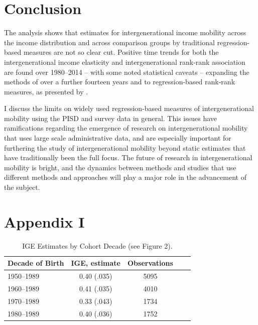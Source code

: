 \documentclass[notitlepage,12pt]{article}
\begin{document}
\section{Conclusion}
The analysis shows that estimates for intergenerational income mobility across the income distribution and across comparison groups by traditional regression-based measures are not so clear cut.  Positive time trends for both the intergenerational income elasticity and intergenerational rank-rank association are found over 1980--2014 -- with some noted statistical caveats -- expanding the methods of \cite{lee2009trends} over a further fourteen years and to regression-based rank-rank measures, as presented by \cite{chetty2014united}.

I discuss the limits on widely used regression-based measures of intergenerational mobility using the PISD and survey data in general.  This issues have ramifications regarding the emergence of research on intergenerational mobility that uses large scale administrative data, and are especially important for furthering the study of intergenerational mobility beyond static estimates that have traditionally been the full focus.  The future of research in intergenerational mobility is bright, and the dynamics between methods and studies that use different methods and approaches will play a major role in the advancement of the subject.  




\section{Appendix I}

\begin{table}[H]
\centering
\caption{IGE Estimates by Cohort Decade (see Figure 2).}
\begin{tabular}{l|cccc}
\midrule
Decade of Birth & IGE, estimate &   Observations & \\
\midrule
1950--1989            & 0.40      (.035) & 5095  \\
1960--1989            & 0.41      (.035) & 4010 \\
1970--1989            & 0.33      (.043) & 1734 \\
1980--1989            & 0.40      (.036) & 1752 \\
\midrule \bottomrule
\end{tabular}
\end{table}
\end{document}
